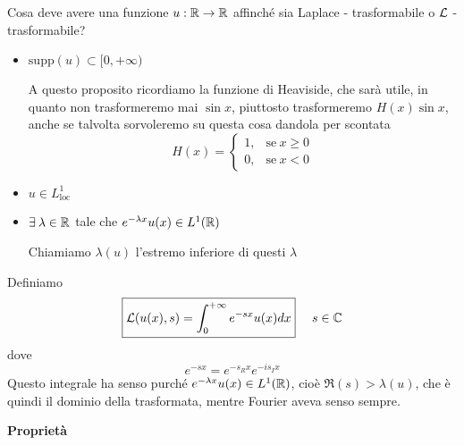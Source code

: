 Cosa deve avere una funzione $u: \mathbb{R}\rightarrow \mathbb{R}$ affinché sia Laplace - trasformabile o $\mathcal{L}$ - trasformabile?
\begin{itemize}
\item $\mathrm{supp}(u) \subset [0, + \infty)$

A questo proposito ricordiamo la funzione di Heaviside, che sarà utile, in quanto non trasformeremo mai $\sin x$, piuttosto trasformeremo $H(x)\sin x$, anche se talvolta sorvoleremo su questa cosa dandola per scontata
\begin{equation*}
H(x) =
\begin{cases}
1, & \text{se} \ x\geq 0\\
0, & \text{se} \ x < 0
\end{cases}
\end{equation*}
\item $u\in L^{1}_{\mathrm{loc}}$
\item $\exists \lambda \in \RR$ tale che $e^{- \lambda x} u(x) \in L^{1}(\mathbb{R})$

Chiamiamo $\lambda (u)$ l'estremo inferiore di questi $\lambda $
\end{itemize}
\begin{defn}
Definiamo
\begin{equation*}
\boxed{\mathcal{L}(u(x), s) = \int^{+ \infty}_{0} e^{- sx} u(x) dx} \ \ \ \ s\in \mathbb{C}
\end{equation*}
dove
\begin{equation*}
e^{- sx} = e^{- s_{R} x} e^{- is_{I} x}
\end{equation*}
Questo integrale ha senso purché $e^{- \lambda x} u(x) \in L^{1}(\mathbb{R})$, cioè $\Re (s) > \lambda (u)$, che è quindi il dominio della trasformata, mentre Fourier aveva senso sempre.
\end{defn}
\textbf{Proprietà}
